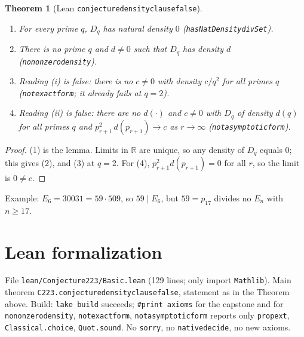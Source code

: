 \documentclass[11pt]{article}
\renewcommand{\_}{\oldus\allowbreak}
\newtheorem{theorem}{Theorem}
\theoremstyle{definition}
\theoremstyle{remark}
\begin{document}
\begin{theorem}[Lean \texttt{conjecture\_223\_density\_clause\_false}]
\leavevmode
\begin{enumerate}[nosep]
\item For every prime $q$, $D_q$ has natural density $0$ (\texttt{hasNatDensity\_divSet}).
\item There is no prime $q$ and $d \ne 0$ such that $D_q$ has density $d$ (\texttt{no\_nonzero\_density}).
\item Reading (i) is false: there is no $c \ne 0$ with density $c/q^2$ for all primes $q$
  (\texttt{not\_exact\_form}; it already fails at $q = 2$).
\item Reading (ii) is false: there are no $d(\cdot)$ and $c \ne 0$ with $D_q$ of density $d(q)$ for all primes
  $q$ and $p_{r+1}^2\, d(p_{r+1}) \to c$ as $r \to \infty$ (\texttt{not\_asymptotic\_form}).
\end{enumerate}
\end{theorem}
\begin{proof}
(1) is the lemma. Limits in $\mathbb{R}$ are unique, so any density of $D_q$ equals $0$; this gives (2), and
(3) at $q = 2$. For (4), $p_{r+1}^2 d(p_{r+1}) = 0$ for all $r$, so the limit is $0 \ne c$.
\end{proof}

Example: $E_6 = 30031 = 59 \cdot 509$, so $59 \mid E_6$, but $59 = p_{17}$ divides no $E_n$ with $n \ge 17$.

\section{Lean formalization}

File \texttt{lean/Conjecture223/Basic.lean} (129 lines; only import \texttt{Mathlib}). Main
theorem \texttt{C223.conjecture\_223\_density\_clause\_false}, statement as in the Theorem above. Build:
\texttt{lake build} succeeds; \texttt{\#print axioms} for the capstone and for \texttt{no\_nonzero\_density},
\texttt{not\_exact\_form}, \texttt{not\_asymptotic\_form} reports only \texttt{propext},
\texttt{Classical.choice}, \texttt{Quot.sound}. No \texttt{sorry}, no \texttt{native\_decide}, no new axioms.
\end{document}
